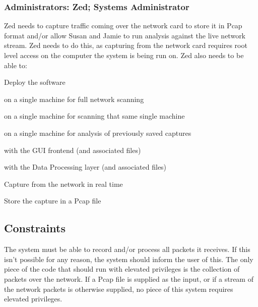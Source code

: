 \documentclass[titlepage]{article}
\begin{document}

\subsubsection{Administrators: Zed; Systems Administrator%
  \label{zed}%
}

Zed needs to capture traffic coming over the network card to store it in Pcap
format and/or allow Susan and Jamie to run analysis against the live network
stream.  Zed needs to do this, as capturing from the network card requires root
level access on the computer the system is being run on.  
%
Zed also needs to be able to:
\begin{itemize*}
    \item Deploy the software
    \begin{itemize*}
        \item on a single machine for full network scanning
        \item on a single machine for scanning that same single machine
        \item on a single machine for analysis of previously saved captures
        \item with the GUI frontend (and associated files)
        \item with the Data Processing layer (and associated files)
    \end{itemize*}
    \item Capture from the network in real time
    \item Store the capture in a Pcap file
\end{itemize*}


\subsection{Constraints%
  \label{constraints}%
}

The system must be able to record and/or process all packets it receives.  If
this isn't possible for any reason, the system should inform the user of this.
The only piece of the code that should run with elevated privileges is the
collection of packets over the network.  If a Pcap file is supplied as the
input, or if a stream of the network packets is otherwise supplied, no piece of
this system requires elevated privileges.
\end{document}
